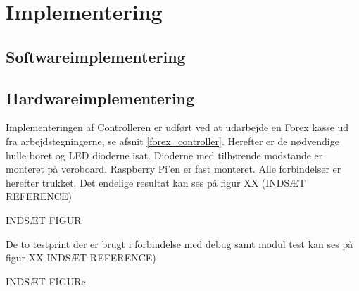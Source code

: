 \section{Implementering}

\subsection{Softwareimplementering}


\subsection{Hardwareimplementering}

Implementeringen af Controlleren er udført ved at udarbejde en Forex kasse ud fra arbejdstegningerne, se afsnit \ref{forex_controller}. Herefter er de nødvendige hulle boret og LED dioderne isat. Dioderne med tilhørende modstande er monteret på veroboard. Raspberry Pi'en er fast monteret. Alle forbindelser er herefter trukket.
Det endelige resultat kan ses på figur XX (INDSÆT REFERENCE)

INDSÆT FIGUR

De to testprint der er brugt i forbindelse med debug samt modul test kan ses på figur XX INDSÆT REFERENCE)

INDSÆT FIGURe
